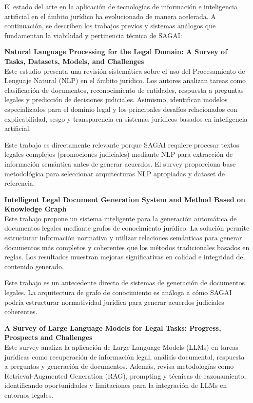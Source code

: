 El estado del arte en la aplicación de tecnologías de información e inteligencia artificial en el ámbito jurídico ha evolucionado de manera acelerada. A continuación, se describen los trabajos previos y sistemas análogos que fundamentan la viabilidad y pertinencia técnica de SAGAI:

\textbf{Natural Language Processing for the Legal Domain: A Survey of Tasks, Datasets, Models, and Challenges} \cite{Ariai2025} \\
Este estudio presenta una revisión sistemática sobre el uso del Procesamiento de Lenguaje Natural (NLP) en el ámbito jurídico. Los autores analizan tareas como clasificación de documentos, reconocimiento de entidades, respuesta a preguntas legales y predicción de decisiones judiciales. Asimismo, identifican modelos especializados para el dominio legal y los principales desafíos relacionados con explicabilidad, sesgo y transparencia en sistemas jurídicos basados en inteligencia artificial.

Este trabajo es directamente relevante porque SAGAI requiere procesar textos legales complejos (promociones judiciales) mediante NLP para extracción de información semántica antes de generar acuerdos. El survey proporciona base metodológica para seleccionar arquitecturas NLP apropiadas y dataset de referencia.
\vspace{0.3cm}

\textbf{Intelligent Legal Document Generation System and Method Based on Knowledge Graph} \cite{KnowledgeGraph2024} \\
Este trabajo propone un sistema inteligente para la generación automática de documentos legales mediante grafos de conocimiento jurídico. La solución permite estructurar información normativa y utilizar relaciones semánticas para generar documentos más completos y coherentes que los métodos tradicionales basados en reglas. Los resultados muestran mejoras significativas en calidad e integridad del contenido generado.

Este trabajo es un antecedente directo de sistemas de generación de documentos legales. La arquitectura de grafo de conocimiento es análoga a cómo SAGAI podría estructurar normatividad jurídica para generar acuerdos judiciales coherentes.
\vspace{0.3cm}

\textbf{A Survey of Large Language Models for Legal Tasks: Progress, Prospects and Challenges} \cite{SurveyLLMLegal2026} \\
Este survey analiza la aplicación de Large Language Models (LLMs) en tareas jurídicas como recuperación de información legal, análisis documental, respuesta a preguntas y generación de documentos. Además, revisa metodologías como Retrieval-Augmented Generation (RAG), prompting y técnicas de razonamiento, identificando oportunidades y limitaciones para la integración de LLMs en entornos legales.

